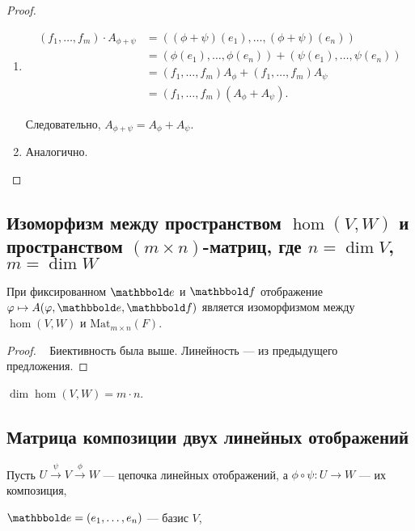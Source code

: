 \begin{proof}~
    \begin{enumerate}
    \item 
        \begin{align*}
            (f_1, \dots, f_m) \cdot A_{\phi + \psi}
            &= ((\phi + \psi)(e_1), \dots, (\phi + \psi)(e_n)) \\
            &= (\phi(e_1), \dots, \phi(e_n)) + (\psi(e_1), \dots, \psi(e_n)) \\
            &= (f_1, \dots, f_m) A_\phi + (f_1, \dots, f_m) A_\psi \\
            &= (f_1, \dots, f_m) (A_\phi + A_\psi)
        .\end{align*}

        Следовательно, $A_{\phi + \psi} = A_\phi + A_\psi$.

    \item Аналогично. \qedhere
    \end{enumerate}
\end{proof}


\subsection{Изоморфизм между пространством $\hom(V,W)$ и пространством $(m \times n)$-матриц, где $n = \dim V$, $m = \dim W$}

\begin{corollary}
    При фиксированном $\E$ и $\F$ отображение $\phi \mapsto A(\phi, \E, \F)$ является изоморфизмом между $\hom(V, W)$ и $\text{Mat}_{m \times n}(F)$.
\end{corollary}

\begin{proof}~
    Биективность была выше.
    Линейность --- из предыдущего предложения.
\end{proof}

\begin{corollary}
    $\dim \hom(V, W) = m \cdot n$.
\end{corollary}


\subsection{Матрица композиции двух линейных отображений}

Пусть $U \xrightarrow{\psi} V \xrightarrow{\phi} W$ --- цепочка линейных отображений, а $\phi \circ \psi : U \to W$ --- их композиция,

$\E = (e_1, \dots, e_n)$ --- базис $V$,

